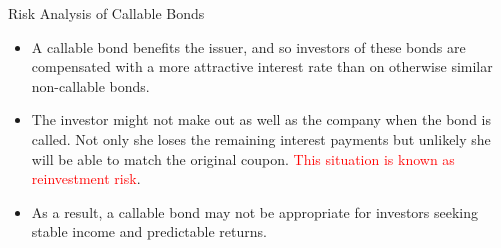 \documentclass{beamer}
\begin{document}

\begin{frame}{Risk Analysis of Callable Bonds}
	\begin{itemize}
		\item A callable bond benefits the issuer, and so investors of these bonds are compensated with a more attractive interest rate than on otherwise similar non-callable bonds.
		\item<1-> The investor might not make out as well as the company when the bond is called. Not only she loses the remaining interest payments but unlikely she will be able to match the original coupon.
		\textcolor{red}{This situation is known as reinvestment risk}. 

		\item<2-> As a result, a callable bond may not be appropriate for investors seeking stable income and predictable returns.
	\end{itemize}
\end{frame}
\end{document}
